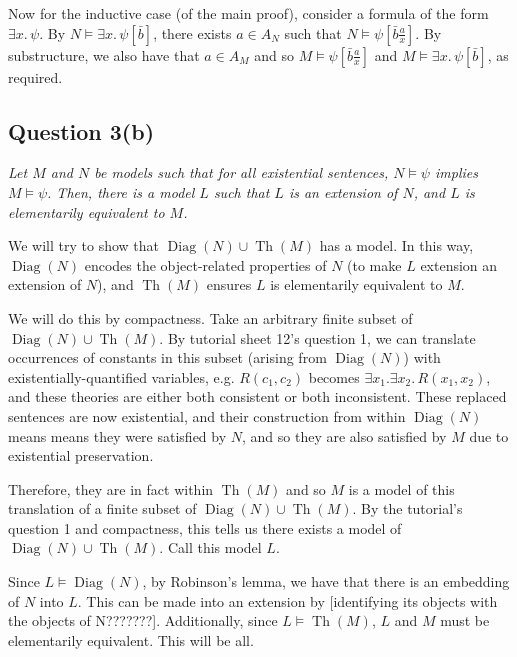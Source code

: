 \documentclass[a4paper]{article}
\DeclareMathOperator{\Diag}{Diag}
\DeclareMathOperator{\Th}{Th}
\begin{document}
Now for the inductive case (of the main proof), consider a formula of the form $\exists x.\,\psi$. 
By $N \models \exists x.\, \psi[\bar b]$, there exists $a \in A_N$
such that $N \models \psi[\bar b \frac a x]$.
By substructure, we also have that $a \in A_M$ and so
$M \models \psi[\bar b \frac a x]$ and
$M \models \exists x.\,\psi[\bar b]$,
as required.
  

\subsection*{Question 3(b)}
\begin{center}
  \textit{Let $M$ and $N$ be models such that for all existential sentences, $N \models \psi$ implies $M \models \psi$.
  Then, there is a model $L$ such that $L$ is an extension of $N$, and $L$ is elementarily equivalent to $M$.}
\end{center}
We will try to show that $\Diag(N) \cup \Th(M)$ has a model.
In this way, $\Diag(N)$ encodes the object-related properties of $N$
(to  make $L$ extension an extension of $N$),
and $\Th(M)$ ensures $L$ is elementarily equivalent to $M$.

We will do this by compactness.
Take an arbitrary finite subset of $\Diag(N) \cup \Th(M)$.
By tutorial sheet 12's question 1, we can translate occurrences
of constants in this subset (arising from $\Diag(N)$)
with existentially-quantified variables,
e.g. $R(c_1,c_2)$ becomes $\exists x_1.\exists x_2.\, R(x_1, x_2)$,
and these theories are either both consistent or both inconsistent.
These replaced sentences are now existential,
and their construction from within $\Diag(N)$ means
means they were satisfied by $N$, and so they are also satisfied by $M$
due to existential preservation.

Therefore, they are in fact within $\Th(M)$ and so $M$
is a model of this translation of a finite subset of $\Diag(N) \cup \Th(M)$.
By the tutorial's question 1 and compactness,
this tells us there exists a model of $\Diag(N) \cup \Th(M)$.
Call this model $L$. 

Since $L \models \Diag(N)$, by Robinson's lemma,
we have that there is an embedding of $N$ into $L$.
This can be made into an extension by [identifying its objects with the objects of N???????].
Additionally,
since $L \models \Th(M)$, $L$ and $M$ must be elementarily equivalent.
This will be all.

\end{document}
